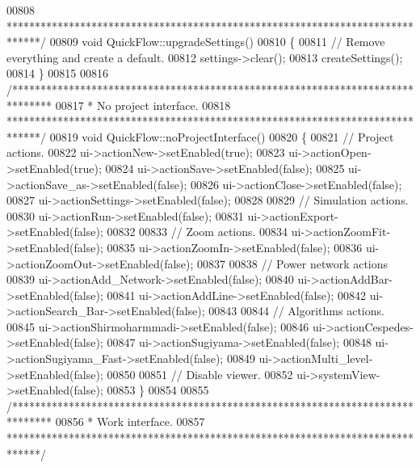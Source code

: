 \begin{DoxyCode}
00808 \textcolor{comment}{ ******************************************************************************/}
00809 \textcolor{keywordtype}{void} QuickFlow::upgradeSettings()
00810 \{
00811   \textcolor{comment}{// Remove everything and create a default.}
00812   settings->clear();
00813   createSettings();
00814 \}
00815 
00816 \textcolor{comment}{/*******************************************************************************}
00817 \textcolor{comment}{ * No project interface.}
00818 \textcolor{comment}{ ******************************************************************************/}
00819 \textcolor{keywordtype}{void} QuickFlow::noProjectInterface()
00820 \{
00821   \textcolor{comment}{// Project actions.}
00822   ui->actionNew->setEnabled(\textcolor{keyword}{true});
00823   ui->actionOpen->setEnabled(\textcolor{keyword}{true});
00824   ui->actionSave->setEnabled(\textcolor{keyword}{false});
00825   ui->actionSave\_as->setEnabled(\textcolor{keyword}{false});
00826   ui->actionClose->setEnabled(\textcolor{keyword}{false});
00827   ui->actionSettings->setEnabled(\textcolor{keyword}{false});
00828 
00829   \textcolor{comment}{// Simulation actions.}
00830   ui->actionRun->setEnabled(\textcolor{keyword}{false});
00831   ui->actionExport->setEnabled(\textcolor{keyword}{false});
00832 
00833   \textcolor{comment}{// Zoom actions.}
00834   ui->actionZoomFit->setEnabled(\textcolor{keyword}{false});
00835   ui->actionZoomIn->setEnabled(\textcolor{keyword}{false});
00836   ui->actionZoomOut->setEnabled(\textcolor{keyword}{false});
00837 
00838   \textcolor{comment}{// Power network actions}
00839   ui->actionAdd\_Network->setEnabled(\textcolor{keyword}{false});
00840   ui->actionAddBar->setEnabled(\textcolor{keyword}{false});
00841   ui->actionAddLine->setEnabled(\textcolor{keyword}{false});
00842   ui->actionSearch\_Bar->setEnabled(\textcolor{keyword}{false});
00843 
00844   \textcolor{comment}{// Algorithms actions.}
00845   ui->actionShirmoharmmadi->setEnabled(\textcolor{keyword}{false});
00846   ui->actionCespedes->setEnabled(\textcolor{keyword}{false});
00847   ui->actionSugiyama->setEnabled(\textcolor{keyword}{false});
00848   ui->actionSugiyama\_Fast->setEnabled(\textcolor{keyword}{false});
00849   ui->actionMulti\_level->setEnabled(\textcolor{keyword}{false});
00850 
00851   \textcolor{comment}{// Disable viewer.}
00852   ui->systemView->setEnabled(\textcolor{keyword}{false});
00853 \}
00854 
00855 \textcolor{comment}{/*******************************************************************************}
00856 \textcolor{comment}{ * Work interface.}
00857 \textcolor{comment}{ ******************************************************************************/}

\end{DoxyCode}
